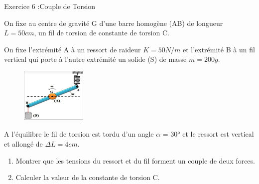 \documentclass[12pt, french]{article}
\begin{document}
\begin{Box2}{Exercice 6 :Couple de Torsion }


On fixe au centre de gravité G d'une barre homogène (AB) de longueur $L = 50cm$, un fil de torsion de
constante de torsion C.

On fixe l'extrémité A à un ressort de raideur $K = 50N/m$ et l'extrémité B
à un fil vertical qui porte à l'autre extrémité un solide (S) de masse
$m=200g$.
	\begin{figure}
  \begin{center}
	  \vspace{-2cm}
	\includegraphics[width=0.28\textwidth]{./img/ex05.png}
  \end{center}
\end{figure}
A l'équilibre le fil de torsion est tordu d'un angle $\alpha$ = 30° et le ressort est
vertical et allongé de $\Delta{L} = 4cm$.

\begin{enumerate}

	\item  Montrer que les tensions du ressort et du fil forment un couple de deux
forces.
\item  Calculer la valeur de la constante de torsion C.
\end{enumerate}

\end{Box2}
\end{document}
